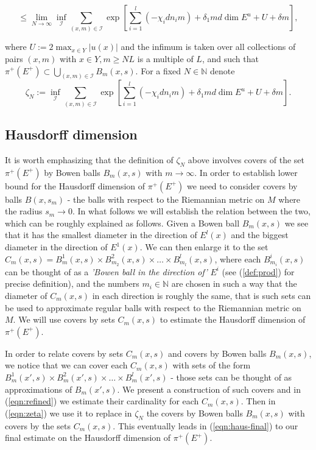 \documentclass{amsart}
\theoremstyle{plain}
\theoremstyle{definition}
\theoremstyle{remark}
\numberwithin{equation}{section}
\begin{document}
$$   \leq    \lim_{N\to \infty}  \inf_{\mathcal{I}}  \sum_{(x,m)\in\mathcal{I}} \exp\left[    \sum_{i=1}^{l}   (-\chi_i    d n_i   m)      +\delta_1 m d   \dim E^u     + U    + \delta m \right],        $$

where $U:= 2 \max_{x\in Y} |  u(x) |$ and the infimum is taken over all collections of pairs $(x,m)$ with $x\in Y, m\geq NL$ is a multiple of $L$, and such that $\pi^+(E^+) \subset \bigcup_{(x,m)\in\mathcal{I}} B_{m}(x,s)$.
For a fixed $N\in\mathbb{N}$ denote
$$   \zeta_N:=  \inf_{\mathcal{I}}  \sum_{(x,m)\in\mathcal{I}} \exp\left[    \sum_{i=1}^{l}   (-\chi_i    d n_i   m)      + \delta_1 m d   \dim E^u     + U    + \delta m \right].    $$


\subsection{Hausdorff dimension}\label{sec:Haus-final}
It is worth emphasizing that the definition of $\zeta_N$ above involves covers of the set  $\pi^+(E^+)$ by Bowen balls $B_m(x,s)$ with $m\to \infty$. In order to establish lower bound for the Hausdorff dimension of  $\pi^+(E^+)$ we need to consider covers by balls $B(x,s_m)$
- the balls with respect to the Riemannian metric on $M$ where the radius $s_m\to 0$. In what follows we will establish the relation between the two, which can be roughly explained as follows.
Given a Bowen ball  $B_m(x,s)$ we see that it has the smallest diameter in the direction of $E^l(x)$ and the biggest diameter in the direction of $E^1(x)$.
We can then enlarge it to the set $C_m(x,s)=B^1_m(x,s)\times B^2_{m_2}(x,s)\times \ldots \times B^l_{m_l}(x,s)$, where each $B^i_{m_i}(x,s)$ can be thought of as a \textit{'Bowen ball in the direction of'} $E^i$ (see (\ref{def:prod}) for precise definition),
and the numbers $m_i\in\mathbb{N}$ are chosen in such a way that the diameter of $C_m(x,s)$ in each direction is roughly the same, that is such sets can be used to approximate regular balls with respect to the Riemannian metric on $M$.
We will use covers by sets  $C_m(x,s)$ to estimate the Hausdorff dimension of $\pi^+(E^+)$.

In order to relate covers by sets $C_m(x,s)$ and covers by Bowen balls $B_m(x,s)$, we notice that we can cover each $C_m(x,s)$ with sets of the form $B^1_m(x',s)\times B^2_{m}(x',s)\times \ldots \times B^l_{m}(x',s)$
- those sets can be thought of as approximations of $B_m(x',s)$. We present a construction of such covers and in (\ref{eqn:refined}) we estimate their cardinality for each $C_m(x,s)$. Then in (\ref{eqn:zeta}) we use it to replace in $\zeta_N$ the covers by  Bowen balls $B_m(x,s)$  with covers by the sets $C_m(x,s)$. This eventually leads in (\ref{eqn:haus-final}) to our final estimate on the Hausdorff dimension of   $\pi^+(E^+)$.\\
\end{document}
